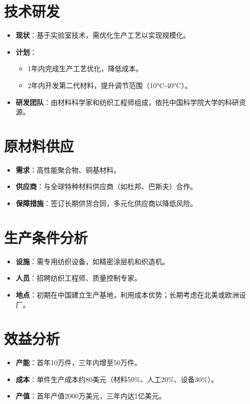 \documentclass[UTF8]{report}
\theoremstyle{MyLineTheoremStyle} %
\theoremstyle{MyBlockTheoremStyle} %
\theoremstyle{MySubsubsectionStyle} %
\begin{document}
\section{技术研发}
\begin{itemize}
    \item \textbf{现状}：基于实验室技术，需优化生产工艺以实现规模化。
    \item \textbf{计划}：
        \begin{itemize}
            \item 1年内完成生产工艺优化，降低成本。
            \item 2年内开发第二代材料，提升调节范围（10°C-40°C）。
        \end{itemize}
    \item \textbf{研发团队}：由材料科学家和纺织工程师组成，依托中国科学院大学的科研资源。
\end{itemize}

\section{原材料供应}
\begin{itemize}
    \item \textbf{需求}：高性能聚合物、铜基材料。
    \item \textbf{供应商}：与全球特种材料供应商（如杜邦、巴斯夫）合作。
    \item \textbf{保障措施}：签订长期供货合同，多元化供应商以降低风险。
\end{itemize}

\section{生产条件分析}
\begin{itemize}
    \item \textbf{设施}：需专用纺织设备，如精密涂层机和织造机。
    \item \textbf{人员}：招聘纺织工程师、质量控制专家。
    \item \textbf{地点}：初期在中国建立生产基地，利用成本优势；长期考虑在北美或欧洲设厂。
\end{itemize}

\section{效益分析}
\begin{itemize}
    \item \textbf{产能}：首年10万件，三年内增至50万件。
    \item \textbf{成本}：单件生产成本约80美元（材料50\%、人工20\%、设备30\%）。
    \item \textbf{产值}：首年产值2000万美元，三年内达1亿美元。
\end{itemize}
\end{document}
